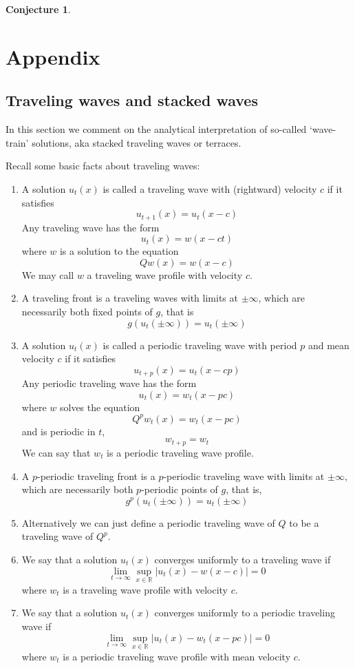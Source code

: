\documentclass{article}
\theoremstyle{definition}
\newtheorem{conjecture}[theorem]{Conjecture}
\numberwithin{equation}{section}
\begin{document}
\begin{conjecture}

\end{conjecture}


\section{Appendix}

\subsection{Traveling waves and stacked waves}

In this section we comment on the analytical interpretation of so-called `wave-train' solutions, aka stacked traveling waves or terraces.

Recall some basic facts about traveling waves:
\begin{enumerate}
\item A solution $u_t(x)$ is called a traveling wave with (rightward) velocity $c$ if it satisfies $$ u_{t+1}(x) = u_t(x-c) $$
Any traveling wave has the form
$$ u_t(x)=w(x-ct) $$
where $w$ is a solution to the equation
$$ Qw(x)=w(x-c) $$
We may call $w$ a traveling wave profile with velocity $c$.
\item A traveling front is a traveling waves with limits at $\pm \infty$, which are necessarily both fixed points of $g$, that is
$$ g(u_t(\pm\infty)) = u_t(\pm\infty) $$
\item A solution $u_t(x)$ is called a periodic traveling wave with period $p$ and mean velocity $c$ if it satisfies $$ u_{t+p}(x)=u_t(x-cp) $$
Any periodic traveling wave has the form
$$ u_t(x)=w_t(x-pc) $$
where $w$ solves the equation
$$ Q^pw_t(x)=w_t(x-pc) $$
and is periodic in $t$,
$$ w_{t+p}=w_t $$
We can say that $w_t$ is a periodic traveling wave profile.
\item A $p$-periodic traveling front is a $p$-periodic traveling wave with limits at $\pm\infty$, which are necessarily both $p$-periodic points of $g$, that is,
$$ g^p(u_t(\pm\infty)) = u_t(\pm\infty) $$
\item Alternatively we can just define a periodic traveling wave of $Q$ to be a traveling wave of $Q^p$.
\item We say that a solution $u_t(x)$ converges uniformly to a traveling wave if
$$ \lim_{t \to \infty} \sup_{x \in \mathbb{R}} |u_t(x)-w(x-c)| = 0 $$
where $w_t$ is a traveling wave profile with velocity $c$.
\item We say that a solution $u_t(x)$ converges uniformly to a periodic traveling wave if
$$ \lim_{t \to \infty} \sup_{x \in \mathbb{R}} |u_t(x)-w_t(x-pc)| = 0 $$
where $w_t$ is a periodic traveling wave profile with mean velocity $c$.
\end{enumerate}
\end{document}
